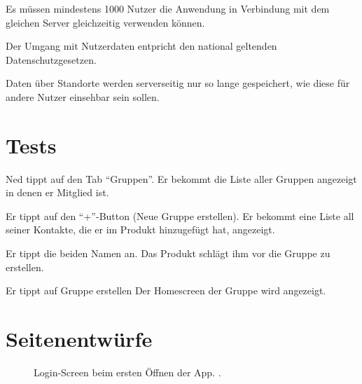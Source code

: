 \documentclass[parskip=full,11pt]{scrartcl}
\begin{document}
Es müssen mindestens 1000 Nutzer die Anwendung in Verbindung mit dem gleichen
Server gleichzeitig verwenden können.

Der Umgang mit Nutzerdaten entpricht den national geltenden
Datenschutzgesetzen.

Daten über Standorte werden serverseitig nur so lange gespeichert, wie diese
für andere Nutzer einsehbar sein sollen.

\section{Tests}


{Ned tippt auf den Tab  \enquote{Gruppen}.}
{Er bekommt die Liste aller Gruppen angezeigt in denen er Mitglied ist.}

{Er tippt auf den \enquote{+}-Button (Neue Gruppe erstellen).}
{Er bekommt eine Liste all seiner Kontakte, die er im Produkt hinzugefügt hat, angezeigt.}

{Er tippt die beiden Namen an.}
{Das Produkt schlägt ihm vor die Gruppe zu erstellen.}

{Er tippt auf Gruppe erstellen}
{Der Homescreen der Gruppe wird angezeigt.} %

\pagebreak
\appendix

\section{Seitenentwürfe}

\begin{figure}[hb]
	\caption{\label{fig:menu}
		Login-Screen beim ersten Öffnen der App.
		 .
	}
\end{figure}
\end{document}
